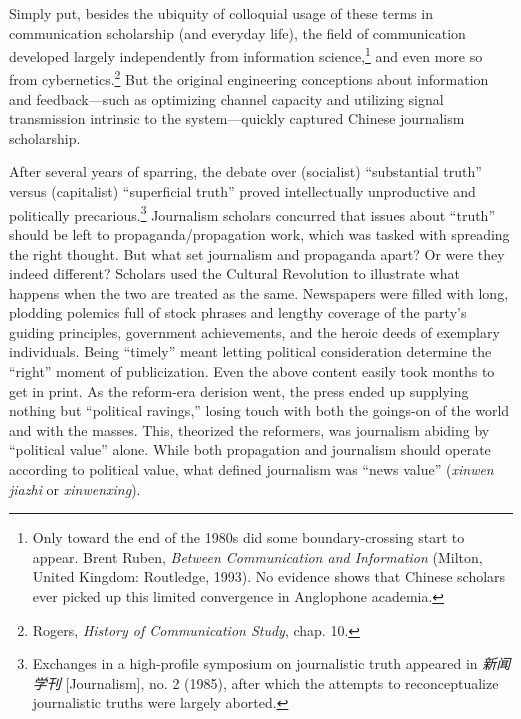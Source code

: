 \documentclass{tufte-handout}
\begin{document}
\begin{CJK*}{UTF8}{gbsn}
Simply put, besides the ubiquity of colloquial usage of these terms in
communication scholarship (and everyday life), the field of
communication developed largely independently from information
science,\footnote{Only toward the end of the 1980s did some
  boundary-crossing start to appear. Brent Ruben, \emph{Between
  Communication and Information} (Milton, United Kingdom: Routledge,
  1993). No evidence shows that Chinese scholars ever picked up this
  limited convergence in Anglophone academia.} and even more so from
cybernetics.\footnote{Rogers, \emph{History of Communication Study},
  chap. 10.} But the original engineering conceptions about information
and feedback---such as optimizing channel capacity and utilizing signal
transmission intrinsic to the system---quickly captured Chinese
journalism scholarship.

After several years of sparring, the debate over (socialist)
``substantial truth'' versus (capitalist) ``superficial truth'' proved
intellectually unproductive and politically precarious.\footnote{Exchanges
  in a high-profile symposium on journalistic truth appeared in
  \emph{新闻学刊} {[}Journalism{]}, no. 2 (1985), after which the
  attempts to reconceptualize journalistic truths were largely aborted.}
Journalism scholars concurred that issues about ``truth'' should be left
to propaganda/propagation work, which was tasked with spreading the
right thought. But what set journalism and propaganda apart? Or were
they indeed different? Scholars used the Cultural Revolution to
illustrate what happens when the two are treated as the same. Newspapers
were filled with long, plodding polemics full of stock phrases and
lengthy coverage of the party's guiding principles, government
achievements, and the heroic deeds of exemplary individuals. Being
``timely'' meant letting political consideration determine the ``right''
moment of publicization. Even the above content easily took months to
get in print. As the reform-era derision went, the press ended up
supplying nothing but ``political ravings,'' losing touch with both the
goings-on of the world and with the masses. This, theorized the
reformers, was journalism abiding by ``political value'' alone. While
both propagation and journalism should operate according to political
value, what defined journalism was ``news value'' (\emph{xinwen jiazhi}
or \emph{xinwenxing}).




\end{CJK*}
\end{document}

